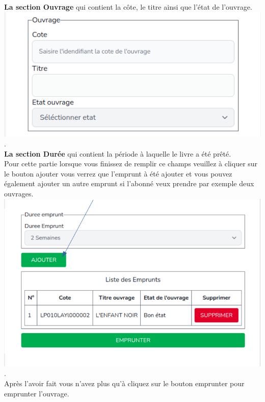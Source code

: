 \documentclass[12pt,a4paper]{article}
\begin{document}
\textbf{La section Ouvrage} qui contient la côte, le titre ainsi que l'état de l'ouvrage.\\

\includegraphics[scale=0.5]{images/EOuvrage.png}.\\

\textbf{La section Durée} qui contient la période à laquelle le livre a été prêté.\\
Pour cette partie lorsque vous finissez de remplir ce champs veuillez à cliquer sur le bouton ajouter vous verrez que l'emprunt à été ajouter et vous pouvez également ajouter un autre emprunt si l'abonné veux prendre par exemple deux ouvrages.\\

\includegraphics[scale=0.5]{images/EDureeAjout.png}.\\
Après l'avoir fait vous n'avez plus qu'à cliquez sur le bouton emprunter pour emprunter l'ouvrage.\\
\end{document}
